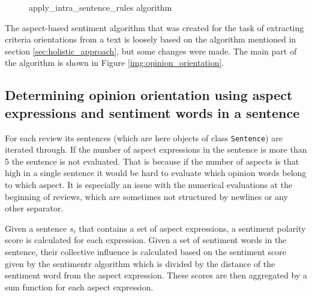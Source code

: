 \begin{figure}[h]
\begin{algorithm}[H]



\end{algorithm}
\caption{apply\_intra\_sentence\_rules algorithm}
\label{img:intra_sentence}
\end{figure}



The aspect-based sentiment algorithm that was created for the task of extracting criteria orientations from a text is loosely based on the algorithm mentioned in section \ref{sec:holistic_approach}, but some changes were made. The main part of the algorithm is shown in Figure \ref{img:opinion_orientation}. 

\subsection{Determining opinion orientation using aspect expressions and sentiment words in a sentence}

For each review its sentences (which are here objects of class \texttt{Sentence}) are iterated through. If the number of aspect expressions in the sentence is more than 5 the sentence is not evaluated. That is because if the number of aspects is that high in a single sentence it would be hard to evaluate which opinion words belong to which aspect. It is especially an issue with the numerical evaluations at the beginning of reviews, which are sometimes not structured by newlines or any other separator.

Given a sentence $s_{i}$ that contains a set of aspect expressions, a sentiment polarity score is calculated for each expression. Given a set of sentiment words in the sentence, their collective influence is calculated based on the sentiment score given by the sentimentr algorithm which is divided by the distance of the sentiment word from the aspect expression. These scores are then aggregated by a sum function for each aspect expression.


